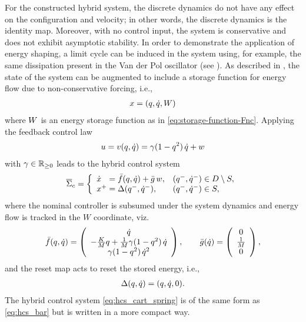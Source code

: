 For the constructed hybrid system, the discrete dynamics do not have any effect
on the configuration and velocity; in other words, the discrete dynamics is the
identity map.
% 
Moreover, with no control input, the system is conservative and does not exhibit
asymptotic stability.
% 
In order to demonstrate the application of energy shaping, a limit cycle can be
induced in the system using, for example, the same dissipation present in the
Van der Pol oscillator (see \cite[pp.~13]{Khalil2002}).
% 
As described in , the state of the system can be
augmented to include a storage function for energy flow due to non-conservative
forcing, i.e.,
\begin{align*}
  x = (q, \dot{q}, W)
\end{align*}
where $W$ is an energy storage function as in \eqref{eq:storage-function-Fnc}.
% 
Applying the feedback control law
\begin{align}
  \label{eq:spring_cart_vdp_controller}
  u = v(q, \dot{q}) = \gamma(1 - q^{2}) \, \dot{q} + w
\end{align}
with $\gamma \in \mathbb{R}_{\geq 0}$ leads to the hybrid control system
\begin{align}
  \label{eq:hcs_cart_spring}
  {\overline {\Sigma}}_{c} = \left\{
    \begin{array}{l l}
      {\dot {x}}\hphantom{^+} = {\bar {f}}(q, \dot{q}) + {\bar {g}} \, w, & (q^{-}, \dot{q}^{-}) \in D \setminus S,\\
      x^{+} = \Delta(q^{-}, \dot{q}^{-}), & (q^{-}, \dot{q}^{-}) \in S,
    \end{array}\right.
\end{align}
where the nominal controller is subsumed under the system dynamics and energy
flow is tracked in the $W$ coordinate, viz.
\begin{align}
  \label{eq:FGbar_cart_spring}
  {\bar {f}}(q, \dot{q}) = \left(\begin{array}{c}
      \dot{q}\\
      -\frac{K}{M} q + \frac{1}{M} \gamma(1 - q^{2}) \, \dot{q}\\
      \gamma(1 - q^{2}) \, \dot{q}^{2}
    \end{array}\right), \qquad
  {\bar {g}}(\dot{q}) = \left(\begin{array}{c}
      0\\
      \frac{1}{M}\\
      0
    \end{array}\right),
\end{align}
and the reset map acts to reset the stored energy, i.e.,
\begin{align*}
  \Delta(q, \dot{q}) = (q, \dot{q}, 0).
\end{align*}
% 
The hybrid control system \eqref{eq:hcs_cart_spring} is of the same form as
\eqref{eq:hcs_bar} but is written in a more compact way.



